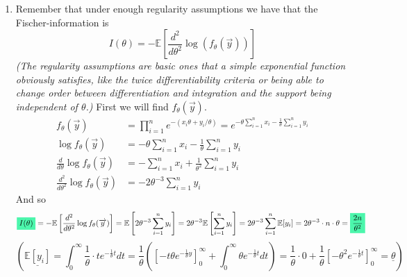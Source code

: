 \documentclass[../main.tex]{subfiles}
\begin{document}
\begin{enumerate}
    
    \item Remember that under enough regularity assumptions we have that the Fischer-information is
    \[I(\theta) = -\mathbb{E}\left[\frac{d^2}{d\theta^2} \log\left(f_{\theta}(\overrightarrow{y})\right)\right]\]
    \emph{(The regularity assumptions are basic ones that a simple exponential function obviously satisfies, like the twice differentiability criteria or being able to change order between differentiation and integration and the support being independent of $\theta$.)}
    First we will find $f_{\theta}(\overrightarrow{y})$. 
    \begin{align*}
        f_{\theta}(\overrightarrow{y})&=\prod_{i=1}^n e^{-(x_i\theta+ y_i/\theta)} = e^{-\theta\sum_{i=1}^n x_i - \frac{1}{\theta}\sum_{i=1}^n y_i} \\
        \log f_{\theta}(\overrightarrow{y}) &= -\theta\sum_{i=1}^n x_i-\frac{1}{\theta}\sum_{i=1}^n y_i \\
        \frac{d}{d\theta}\log f_{\theta}(\overrightarrow{y}) &= -\sum_{i=1}^n x_i+\frac{1}{\theta^2} \sum_{i=1}^n y_i\\
        \frac{d^2}{d\theta^2}\log f_{\theta}(\overrightarrow{y}) &= -2\theta^{-3}\sum_{i=1}^n y_i
    \end{align*}
    And so
    \[\mathcolorbox{goodcolor}{I(\theta)} = -\mathbb{E}\left[\frac{d^2}{d\theta^2}\log f_{\theta}(\overrightarrow{y})\right] = \mathbb{E}\left[2\theta^{-3}\sum_{i=1}^n y_i\right]=2\theta^{-3}\mathbb{E}\left[\sum_{i=1}^n y_i\right] = 2\theta^{-3} \sum_{i=1}^n \mathbb{E}[y_i] = 2\theta^{-3}\cdot n\cdot\theta = \mathcolorbox{goodcolor}{\frac{2n}{\theta^2}}\]
    \[\left(\underline{\mathbb{E}[y_i]} = \int_0^\infty \frac{1}{\theta}\cdot t e^{-\frac{1}{\theta} t}dt = \frac{1}{\theta}\left(\left[-t\theta e^{-\frac{1}{\theta}y}\right]_{0}^{\infty} + \int_0^{\infty}\theta e^{-\frac{1}{\theta} t}dt\right) = \frac{1}{\theta}\cdot0 + \frac{1}{\theta} \left[-\theta^2 e^{-\frac{1}{\theta}t}\right]_0^{\infty} = \underline{\theta} \right)\]
    
    \qedsymbol
    

\end{enumerate}
\end{document}
